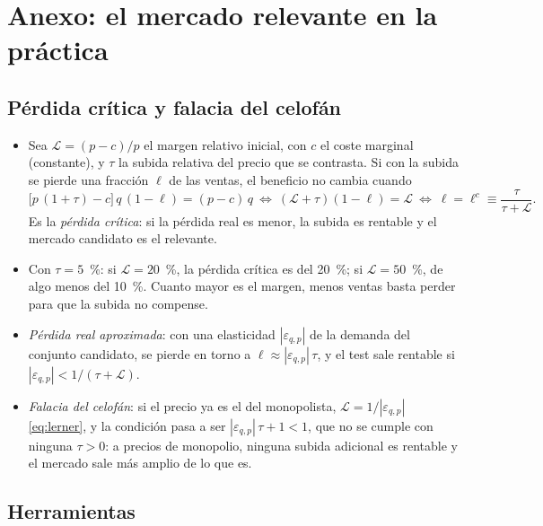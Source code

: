 \documentclass[11pt]{article}
\begin{document}
\section{Anexo: el mercado relevante en la práctica}\label{anexo:mercado-relevante}

\subsection{Pérdida crítica y falacia del celofán}\label{anexo:perdida-critica}

\begin{itemize}
\item Sea $\mathcal{L}=(p-c)/p$ el margen relativo inicial, con $c$ el coste marginal (constante), y $\tau$ la subida relativa del precio que se contrasta. Si con la subida se pierde una fracción $\ell$ de las ventas, el beneficio no cambia cuando
  \[
  \big[p\,(1+\tau)-c\big]\,q\,(1-\ell)=(p-c)\,q\ \Longleftrightarrow\ (\mathcal{L}+\tau)(1-\ell)=\mathcal{L}\ \Longleftrightarrow\ \ell=\ell^{c}\equiv\frac{\tau}{\tau+\mathcal{L}}.
  \]
  Es la \emph{pérdida crítica}\nocite{HarrisSimons1989Focusing}: si la pérdida real es menor, la subida es rentable y el mercado candidato es el relevante.
\item Con $\tau=5$~\%: si $\mathcal{L}=20$~\%, la pérdida crítica es del 20~\%; si $\mathcal{L}=50$~\%, de algo menos del 10~\%. Cuanto mayor es el margen, menos ventas basta perder para que la subida no compense.
\item \emph{Pérdida real aproximada}: con una elasticidad $|\varepsilon_{q,p}|$ de la demanda del conjunto candidato, se pierde en torno a $\ell\approx|\varepsilon_{q,p}|\,\tau$, y el test sale rentable si $|\varepsilon_{q,p}|<1/(\tau+\mathcal{L})$.
\item \emph{Falacia del celofán}: si el precio ya es el del monopolista, $\mathcal{L}=1/|\varepsilon_{q,p}|$ \eqref{eq:lerner}, y la condición pasa a ser $|\varepsilon_{q,p}|\,\tau+1<1$, que no se cumple con ninguna $\tau>0$: a precios de monopolio, ninguna subida adicional es rentable y el mercado sale más amplio de lo que es\nocite{CE2024DefinicionMercado}.\findemo
\end{itemize}

\subsection{Herramientas}\label{anexo:herramientas-mercado}
\end{document}
